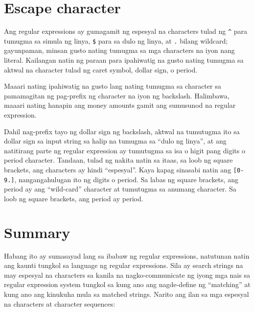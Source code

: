 \documentclass[10pt,]{book}
\newenvironment{Shaded}{}{}
\newcommand{\ErrorTok}[1]{\textcolor[rgb]{1.00,0.00,0.00}{\textbf{#1}}}
\newcommand{\ImportTok}[1]{\textcolor[rgb]{0.00,0.50,0.00}{\textbf{#1}}}
\newcommand{\NormalTok}[1]{#1}
\newcommand{\OperatorTok}[1]{\textcolor[rgb]{0.40,0.40,0.40}{#1}}
\newcommand{\StringTok}[1]{\textcolor[rgb]{0.25,0.44,0.63}{#1}}
\begin{document}
\section{Escape character}\label{escape-character}

Ang regular expressions ay gumagamit ng espesyal na characters tulad ng
\texttt{\^{}} para tumugma sa simula ng linya, \texttt{\$} para sa dulo
ng linya, at \texttt{.} bilang wildcard; gayunpaman, minsan gusto nating
tumugma sa mga characters na iyon nang literal. Kailangan natin ng
paraan para ipahiwatig na gusto nating tumugma sa aktwal na character
tulad ng caret symbol, dollar sign, o period.

Maaari nating ipahiwatig na gusto lang nating tumugma sa character sa
pamamagitan ng pag-prefix ng character na iyon ng backslash. Halimbawa,
maaari nating hanapin ang money amounts gamit ang sumusunod na regular
expression.

\begin{Shaded}
\end{Shaded}

Dahil nag-prefix tayo ng dollar sign ng backslash, aktwal na tumutugma
ito sa dollar sign sa input string sa halip na tumugma sa ``dulo ng
linya'', at ang natitirang parte ng regular expression ay tumutugma sa
isa o higit pang digits o period character. Tandaan, tulad ng nakita
natin sa itaas, sa loob ng square brackets, ang characters ay hindi
``espesyal''. Kaya kapag sinasabi natin ang \texttt{{[}0-9.{]}},
nangangahulugan ito ng digits o period. Sa labas ng square brackets, ang
period ay ang ``wild-card'' character at tumutugma sa anumang character.
Sa loob ng square brackets, ang period ay period.

\section{Summary}\label{summary}

Habang ito ay sumasayad lang sa ibabaw ng regular expressions, natutunan
natin ang kaunti tungkol sa language ng regular expressions. Sila ay
search strings na may espesyal na characters sa kanila na
nagko-communicate ng iyong mga nais sa regular expression system tungkol
sa kung ano ang nagde-define ng ``matching'' at kung ano ang kinukuha
mula sa matched strings. Narito ang ilan sa mga espesyal na characters
at character sequences:
\end{document}
